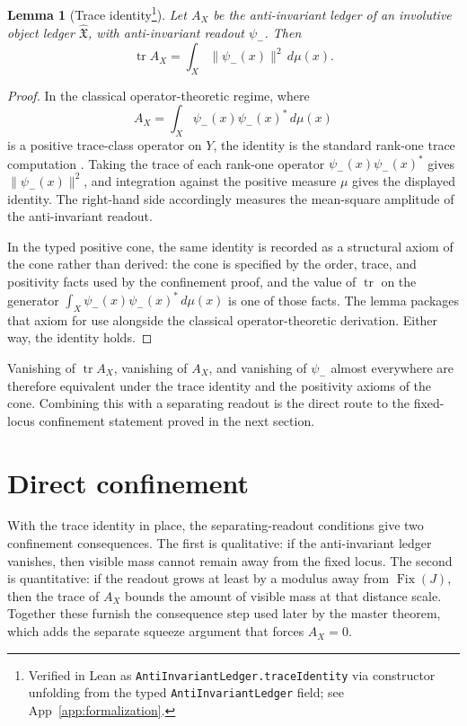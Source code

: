 \documentclass[11pt]{article}
\DeclareMathOperator{\Fix}{Fix}
\DeclareMathOperator{\trace}{tr}
\newcommand{\psim}{\psi_{-}}
\newcommand{\AX}{A_{X}}
\newcommand{\IOL}{\hat{\mathfrak{X}}}
\newtheorem{lemma}[theorem]{Lemma}
\theoremstyle{definition}
\begin{document}
\begin{lemma}[Trace identity\protect\footnote{Verified in Lean as \nolinkurl{AntiInvariantLedger.traceIdentity} via constructor unfolding from the typed \nolinkurl{AntiInvariantLedger} field; see App~\ref{app:formalization}.}]
\label{lem:duality_confinement:trace-identity}
Let \(\AX\) be the anti-invariant ledger of an involutive object
ledger \(\IOL\), with anti-invariant readout \(\psim\).  Then
\[
  \trace\AX
  =
  \int_X \|\psim(x)\|^2\,d\mu(x).
\]
\end{lemma}

\begin{proof}
In the classical operator-theoretic regime, where
\[
  \AX=\int_X \psim(x)\psim(x)^*\,d\mu(x)
\]
is a positive trace-class operator on \(Y\), the identity is the
standard rank-one trace computation \citep{ReedSimon1980,Simon2005}.
Taking the trace of each rank-one operator
\(\psim(x)\psim(x)^*\) gives \(\|\psim(x)\|^2\), and integration
against the positive measure \(\mu\) gives the displayed identity.
The right-hand side accordingly measures the mean-square amplitude of
the anti-invariant readout.

In the typed positive cone, the same identity is recorded as a
structural axiom of the cone rather than derived: the cone is
specified by the order, trace, and positivity facts used by the
confinement proof, and the value of \(\trace\) on the generator
\(\int_X\psim(x)\psim(x)^*\,d\mu(x)\) is one of those facts.  The
lemma packages that axiom for use alongside the classical
operator-theoretic derivation.  Either way, the identity holds.
\end{proof}

Vanishing of \(\trace\AX\), vanishing of \(\AX\), and vanishing of
\(\psim\) almost everywhere are therefore equivalent under the
trace identity and the positivity axioms of the cone.  Combining
this with a separating readout is the direct route to the
fixed-locus confinement statement proved in the next section.
 

\section{Direct confinement}
\label{sec:direct_confinement}

With the trace identity in place, the separating-readout conditions
give two confinement consequences.  The first is qualitative: if
the anti-invariant ledger vanishes, then visible mass cannot remain
away from the fixed locus.  The second is quantitative: if the
readout grows at least by a modulus away from \(\Fix(J)\), then the
trace of \(\AX\) bounds the amount of visible mass at that distance
scale.  Together these furnish the consequence step used later by the
master theorem, which adds the separate squeeze argument that forces
\(\AX=0\).
\end{document}
